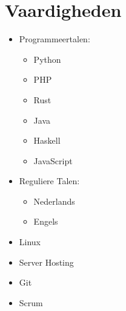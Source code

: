 \documentclass[a4paper,12pt]{article}
\begin{document}
\section{Vaardigheden}
\begin{multicols}{2}
\begin{itemize}
    \item Programmeertalen:
        \begin{itemize}
            \item Python
            \item PHP
            \item Rust
            \item Java
            \item Haskell
            \item JavaScript
        \end{itemize}
    \item Reguliere Talen:
        \begin{itemize}
            \item Nederlands
            \item Engels
        \end{itemize}
    \item Linux
    \item Server Hosting
    \item Git
    \item Scrum
\end{itemize}
\end{multicols}

\vfill
{}
\end{document}
